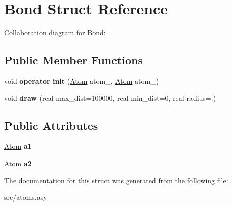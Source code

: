 \hypertarget{structBond}{\section{Bond Struct Reference}
\label{structBond}
}


Collaboration diagram for Bond\+:
\subsection*{Public Member Functions}
\begin{DoxyCompactItemize}
\item 
\hypertarget{structBond_a2e6abed7fc392702e90934c0a50b30bc}{void {\bfseries operator init} (\hyperlink{structAtom}{Atom} atom\+\_, \hyperlink{structAtom}{Atom} atom\+\_)}\label{structBond_a2e6abed7fc392702e90934c0a50b30bc}

\item 
\hypertarget{structBond_a233d9ad09e0136c71540345325ab7f87}{void {\bfseries draw} (real max\+\_\+dist=100000, real min\+\_\+dist=0, real radius=.)}\label{structBond_a233d9ad09e0136c71540345325ab7f87}

\end{DoxyCompactItemize}
\subsection*{Public Attributes}
\begin{DoxyCompactItemize}
\item 
\hypertarget{structBond_aa09372367188f9aad123f2c14b4e4759}{\hyperlink{structAtom}{Atom} {\bfseries a1}}\label{structBond_aa09372367188f9aad123f2c14b4e4759}

\item 
\hypertarget{structBond_a82e3c9785f79ddb5713e97b38756e884}{\hyperlink{structAtom}{Atom} {\bfseries a2}}\label{structBond_a82e3c9785f79ddb5713e97b38756e884}

\end{DoxyCompactItemize}


The documentation for this struct was generated from the following file\+:\begin{DoxyCompactItemize}
\item 
src/atoms.\+asy\end{DoxyCompactItemize}
